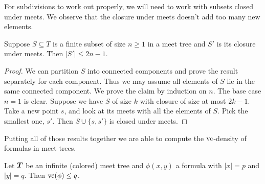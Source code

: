 \documentclass{amsart}
\DeclareMathOperator{\TT}{\boldface T}
\begin{document}
For subdivisions to work out properly, we will need to work with subsets closed under meets. We observe that the closure under meets doesn't add too many new elements.

\begin{Lemma} \label{lm_meet}
  Suppose $S \subseteq T$ is a finite subset of size $n \geq 1$ in a meet tree and $S'$ is its closure under meets. Then $|S'| \leq 2n - 1$.
\end{Lemma}
\begin{proof}
  We can partition $S$ into connected components and prove the result separately for each component. Thus we may assume all elements of $S$ lie in the same connected component. We prove the claim by induction on $n$. The base case $n = 1$ is clear. Suppose we have $S$ of size $k$ with closure of size at most $2k - 1$. Take a new point $s$, and look at its meets with all the elements of $S$. Pick the smallest one, $s'$. Then $S \cup \{s, s'\}$ is closed under meets.
\end{proof}

Putting all of those results together we are able to compute the $\operatorname{vc}$-density of formulas in meet trees.

\begin{Theorem}
  Let $\TT$ be an infinite (colored) meet tree and $\phi(x, y)$ a formula with $|x| = p$ and $|y| = q$. Then $\operatorname{vc}(\phi) \leq q$.
\end{Theorem}
\end{document}
